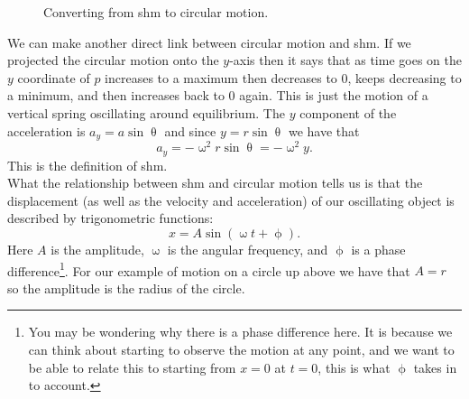 \documentclass[a4paper,12pt]{book}
\begin{document}
\begin{figure}[ht]
    \centering
    \caption{Converting from shm to circular motion.}
        \label{fig: shm circle}
\end{figure}

We can make another direct link between circular motion and shm. If we projected the circular motion onto the $y$-axis then it says that as time goes on the $y$ coordinate of $p$ increases to a maximum then decreases to $0$, keeps decreasing to a minimum, and then increases back to $0$ again. This is just the motion of a vertical spring oscillating around equilibrium. The $y$ component of the acceleration is $a_{y}=a\sin\uptheta$ and since $y=r\sin\uptheta$ we have that
\begin{equation*}
a_{y}=-\upomega^{2} r\sin\uptheta=-\upomega^{2}y.
\end{equation*}
This is the definition of shm.\\

What the relationship between shm and circular motion tells us is that the displacement (as well as the velocity and acceleration) of our oscillating object is described by trigonometric functions:
\begin{equation}
x=A\sin\left(\upomega t+\upphi\right).
\end{equation}
Here $A$ is the amplitude, $\upomega$ is the angular frequency, and $\upphi$ is a phase difference\footnote{You may be wondering why there is a phase difference here. It is because we can think about starting to observe the motion at any point, and we want to be able to relate this to starting from $x=0$ at $t=0$, this is what $\upphi$ takes in to account.}. For our example of motion on a circle up above we have that $A=r$ so the amplitude is the radius of the circle.\\
\end{document}
